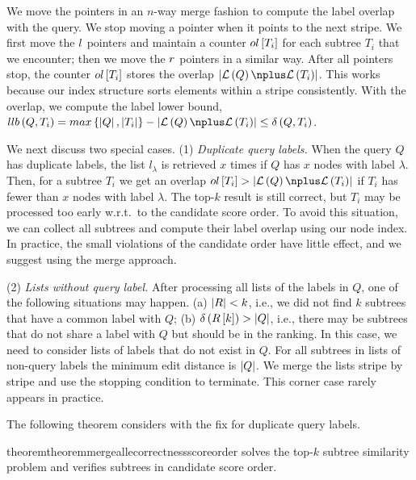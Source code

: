 We move the pointers in an $n$-way merge fashion to compute the label overlap with the query. We stop moving a pointer when it points to the next stripe. We first move the $l$ pointers and maintain a counter $ol\left[ T_i \right]$ for each subtree $T_i$ that we encounter; then we move the $r$ pointers in a similar way. After all pointers stop, the counter $ol\left[ T_i \right]$ stores the overlap $\MultisetOverlapSize{Q}{T_i}$. This works because our index structure sorts elements within a stripe consistently. With the overlap, we compute the label lower bound, $\LLBshort{Q}{T_i} = \LLB{Q}{T_i} \leq \TED{Q}{T_i}$.%

We next discuss two special cases. (1) \emph{Duplicate query labels.} When the query $Q$ has duplicate labels, the list $l_{\lambda}$ is retrieved $x$ times
if $Q$ has $x$ nodes with label $\lambda$. Then, for a subtree $T_i$ we get an overlap $ol\at{T_i} > \MultisetOverlapSize{Q}{T_i}$ if $T_i$ has fewer than $x$ nodes with label $\lambda$. The top-$k$ result is still correct, but $T_i$ may be processed too early w.r.t.\ to the candidate score order. To avoid this situation, we can collect all subtrees and compute their label overlap using our node index. In practice, the small violations of the candidate order have little effect, and we suggest using the merge approach.

(2) \emph{Lists without query label.}  After processing all lists of the labels in $Q$, one of the following situations may happen. \newline (a) $\left| R \right| < k$, i.e., we did not find $k$ subtrees that have a common label with $Q$; (b) $\delta \left( R\left[ k \right] \right) > \left| Q \right|$, i.e., there may be subtrees that do not share a label with $Q$ but should be in the ranking. In this case, we need to consider lists of labels that do not exist in $Q$. For all subtrees in lists of non-query labels the minimum edit distance is $\left| Q \right|$. We merge the lists stripe by stripe and use the stopping condition to terminate. This corner case rarely appears in practice.

The following theorem considers \lowerboundmerge{} with the fix for duplicate query labels.

\begin{restatable}{theorem}{theoremmergeallecorrectnessscoreorder}
\lowerboundmerge{} solves the top-$k$ subtree similarity problem and verifies subtrees in candidate score order.
\end{restatable}

